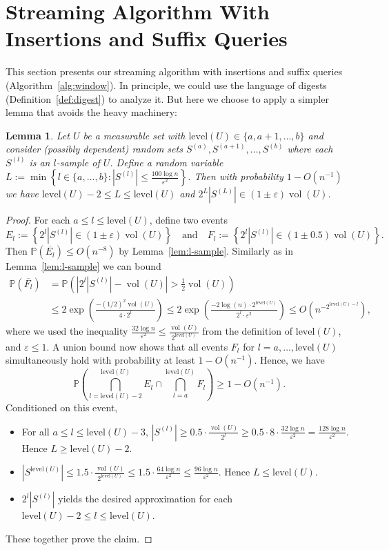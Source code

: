 \documentclass[11pt]{article}
\def\vol{\operatorname{vol}}		%
\def\set#1{\left\{ #1 \right\}}
\def\card#1{\left\lvert #1 \right\rvert}		%
\newtheorem{lemma}[theorem]{Lemma}
\newcommand{\level}{\mathrm{level}}
\newcommand{\eps}{\varepsilon}
\renewcommand{\Pr}{\mathbb{P}}
\begin{document}
\section{Streaming Algorithm With Insertions and Suffix Queries}
\label{sec:window}
%
This section presents our streaming algorithm with insertions and suffix queries (Algorithm~\ref{alg:window}).
In principle, we could use the language of digests (Definition~\ref{def:digest}) to analyze it. But here we choose to apply a simpler lemma that avoids the heavy machinery:
\begin{lemma}
    \label{lem:select-sample}
    Let $U$ be a measurable set with $\level(U) \in \{a,a+1,\ldots,b\}$ and consider (possibly dependent) random sets $S^{(a)}, S^{(a+1)}, \dots, S^{(b)}$ where each $S^{(l)}$ is an $l$-sample of $U$. Define a random variable $L := \min \set{l \in \{a,\ldots,b\} : |S^{(l)}| \leq \frac{100 \log n}{\eps^2}}$. Then with probability $1 - O(n^{-1})$ we have $\level(U)-2 \leq L \leq \level(U)$ and $2^L |S^{(L)}| \in (1 \pm \eps) \vol(U)$.
\end{lemma}
%
\begin{proof}
    For each $a \leq l \leq \level(U)$, define two events
    \[
        E_l := \set{2^l |S^{(l)}| \in (1 \pm \eps) \vol(U)} \quad\text{and}\quad
        F_l := \set{2^l |S^{(l)}| \in (1 \pm 0.5) \vol(U)}.
    \]
    Then $\Pr(\overline{E_l}) \leq O(n^{-8})$ by Lemma~\ref{lem:l-sample}. Similarly as in Lemma~\ref{lem:l-sample} we can bound 
    \begin{align*}
        \Pr(\overline{F_l})
        &= \Pr \left( \left| 2^l |S^{(l)}| - \vol(U) \right| > \tfrac 12 \vol(U) \right) \\
        &\leq 2\exp\left( \frac{-(1/2)^2 \vol(U)}{4 \cdot 2^l} \right)
        \leq 2\exp\left( \frac{-2 \log(n) \cdot 2^{\level(U)}}{2^l \cdot \eps^2} \right)
        \leq O(n^{-2^{\level(U)-l}}),
    \end{align*}
    where we used the inequality $\frac{32 \log n}{\eps^2} \leq \frac{\vol(U)}{2^{\level(U)}}$ from the definition of $\level(U)$, and $\eps \le 1$. A union bound now shows that all events $F_l$ for $l = a,\ldots,\level(U)$ simultaneously hold with probability at least $1 - O(n^{-1})$. Hence, we have
    \[
        \Pr\left( \bigcap_{l=\level(U)-2}^{\level(U)} E_l \cap \bigcap_{l=a}^{\level(U)} F_l \right)
        \geq 1 - O(n^{-1}).
    \]
    Conditioned on this event,
    \begin{itemize}
        \item For all $a \leq l \leq \level(U) - 3$, $\card{S^{(l)}} \geq 0.5 \cdot \frac{\vol(U)}{2^l} \geq 0.5 \cdot 8 \cdot \frac{32 \log n}{\eps^2} = \frac{128 \log n}{\eps^2}$. Hence $L \geq \level(U) - 2$.
        \item $\card{S^{\level(U)}} \leq 1.5 \cdot \frac{\vol(U)}{2^{\level(U)}} \leq 1.5 \cdot \frac{64 \log n}{\eps^2} \leq \frac{96 \log n}{\eps^2}$. Hence $L \leq \level(U)$.
        \item $2^l |S^{(l)}|$ yields the desired approximation for each $\level(U) - 2 \le l \le \level(U)$.
    \end{itemize}
    These together prove the claim.
\end{proof}
\end{document}
